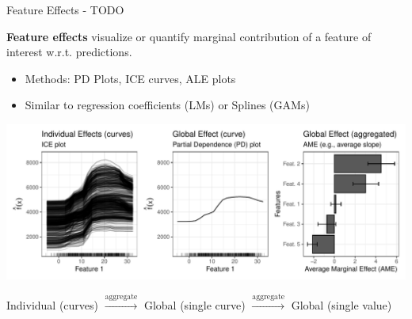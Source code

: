 \documentclass[11pt,compress,t,notes=noshow, aspectratio=169, xcolor=table]{beamer}
\begin{document}
\begin{frame}{Feature Effects - TODO}

\textbf{Feature effects} visualize or quantify marginal contribution of a feature of interest w.r.t. predictions. %
\begin{itemize}
\item Methods: PD Plots, ICE curves, ALE plots
\item Similar to regression coefficients (LMs) or Splines (GAMs)
\end{itemize}

\centerline{\includegraphics[width=\textwidth]{figure/feature-effect.pdf}}

\centerline{\small \hspace{20px} Individual (curves) \hspace{8px}
$\xrightarrow[]{\text{aggregate}}$ \hspace{8px} Global (single curve) \hspace{8px}
$\xrightarrow[]{\text{aggregate}}$ \hspace{8px} Global (single value)}


\end{frame}


\endlecture
\end{document}

